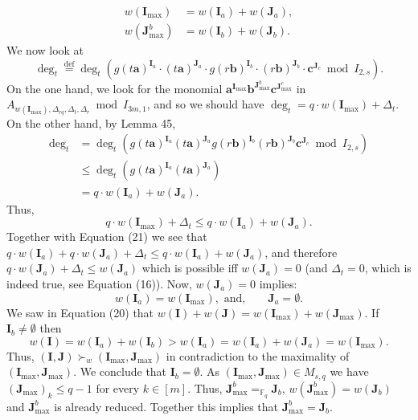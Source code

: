 \documentclass[10pt,a4paper]{article}
\begin{document}
\begin{align*}
w(\boldsymbol I_{\max})&=w(\boldsymbol I_a)+w(\boldsymbol J_a),\tag{21}\\
w(\boldsymbol J_{\max}^b)&=w(\boldsymbol I_b)+w(\boldsymbol J_b).\tag{22}
\end{align*}
We now look at
\[\deg_t\stackrel{\mathrm{def}}=\deg_t(g(t\boldsymbol a)^{\boldsymbol I_a}\cdot(t\boldsymbol a)^{\boldsymbol J_a}\cdot g(r\boldsymbol b)^{\boldsymbol I_b}\cdot(r\boldsymbol b)^{\boldsymbol J_b}\cdot\boldsymbol c^{\boldsymbol J_c}\bmod I_{2,s}).\]
On the one hand, we look for the monomial $\boldsymbol a^{\boldsymbol I_{\max}}\boldsymbol b^{\boldsymbol J_{\max}^b}\boldsymbol c^{\boldsymbol J_{\max}^c}$ in $A_{w(\boldsymbol I_{\max}),\Delta_{rq},\Delta_t,\Delta_r}\bmod I_{3m,1}$, and so we should have $\deg_t=q\cdot w(\boldsymbol I_{\max})+\Delta_t$. On the other hand, by Lemma 45,
\begin{align*}
\deg_t&=\deg_t(g(t\boldsymbol a)^{\boldsymbol I_a}(t\boldsymbol a)^{\boldsymbol J_a}g(r\boldsymbol b)^{\boldsymbol I_b}(r\boldsymbol b)^{\boldsymbol J_b}\boldsymbol c^{\boldsymbol J_c}\bmod I_{2,s})\\
&\leq\deg_t(g(t\boldsymbol a)^{\boldsymbol I_a}(t\boldsymbol a)^{\boldsymbol J_a})\\
&=q\cdot w(\boldsymbol I_a)+w(\boldsymbol J_a).
\end{align*}
Thus,
\[q\cdot w(\boldsymbol I_{\max})+\Delta_t\leq q\cdot w(\boldsymbol I_a)+w(\boldsymbol J_a).\]
Together with Equation (21) we see that $q\cdot w(\boldsymbol I_a)+q\cdot w(\boldsymbol J_a)+\Delta_t\leq q\cdot w(\boldsymbol I_a)+w(\boldsymbol J_a)$, and therefore $q\cdot w(\boldsymbol J_a)+\Delta_t\leq w(\boldsymbol J_a)$ which is possible iff $w(\boldsymbol J_a)=0$ (and $\Delta_t=0$, which is indeed true, see Equation (16)). Now, $w(\boldsymbol J_a)=0$ implies:
\[w(\boldsymbol I_a)=w(\boldsymbol I_{\max}),\text{ and,}\qquad\boldsymbol J_a=\emptyset.\]
We saw in Equation (20) that $w(\boldsymbol I)+w(\boldsymbol J)=w(\boldsymbol I_{\max})+w(\boldsymbol J_{\max})$. If $\boldsymbol I_b\neq\emptyset$ then
\[w(\boldsymbol I)=w(\boldsymbol I_a)+w(\boldsymbol I_b)>w(\boldsymbol I_a)=w(\boldsymbol I_a)+w(\boldsymbol J_a)=w(\boldsymbol I_{\max}).\]
Thus, $(\boldsymbol I,\boldsymbol J)\succ_w(\boldsymbol I_{\max},\boldsymbol J_{\max})$ in contradiction to the maximality of $(\boldsymbol I_{\max},\boldsymbol J_{\max})$. We conclude that $\boldsymbol I_b=\emptyset$.
As $(\boldsymbol I_{\max},\boldsymbol J_{\max})\in M_{s,q}$ we have $(\boldsymbol J_{\max})_k\leq q-1$ for every $k\in[m]$. Thus, $\boldsymbol J_{\max}^b=_{\mathbb F_q}\boldsymbol J_b$, $w(\boldsymbol J_{\max}^b)=w(\boldsymbol J_b)$ and $\boldsymbol J_{\max}^b$ is already reduced. Together this implies that $\boldsymbol J_{\max}^b=\boldsymbol J_b$.
\end{document}
